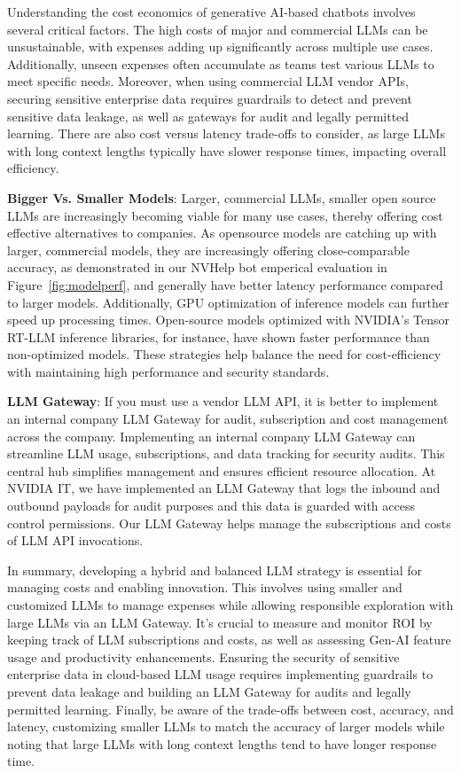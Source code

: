 \documentclass[sigconf]{acmart}
\begin{document}
Understanding the cost economics of generative AI-based chatbots involves several critical factors. The high costs of major and commercial LLMs can be unsustainable, with expenses adding up significantly across multiple use cases. Additionally, unseen expenses often accumulate as teams test various LLMs to meet specific needs. Moreover, when using commercial LLM vendor APIs, securing sensitive enterprise data requires guardrails to detect and prevent sensitive data leakage, as well as gateways for audit and legally permitted learning. There are also cost versus latency trade-offs to consider, as large LLMs with long context lengths typically have slower response times, impacting overall efficiency.

\textbf{Bigger Vs. Smaller Models}: Larger, commercial LLMs, smaller open source LLMs are increasingly becoming viable for many use cases, thereby offering cost effective alternatives to companies. As opensource models are catching up with larger, commercial models, they are increasingly offering close-comparable accuracy, as demonstrated in our NVHelp bot emperical evaluation in Figure~\ref{fig:modelperf}, and generally have better latency performance compared to larger models. Additionally, GPU optimization of inference models can further speed up processing times. Open-source models optimized with NVIDIA’s Tensor RT-LLM inference libraries, for instance, have shown faster performance than non-optimized models. These strategies help balance the need for cost-efficiency with maintaining high performance and security standards.

\textbf{LLM Gateway}: If you must use a vendor LLM API, it is better to implement an internal company LLM Gateway for audit, subscription and cost management across the company. Implementing an internal company LLM Gateway can streamline LLM usage, subscriptions, and data tracking for security audits. This central hub simplifies management and ensures efficient resource allocation. At NVIDIA IT, we have implemented an LLM Gateway that logs the inbound and outbound payloads for audit purposes and this data is guarded with access control permissions. Our LLM Gateway helps manage the subscriptions and costs of LLM API invocations. 

In summary, developing a hybrid and balanced LLM strategy is essential for managing costs and enabling innovation. This involves using smaller and customized LLMs to manage expenses while allowing responsible exploration with large LLMs via an LLM Gateway. It's crucial to measure and monitor ROI by keeping track of LLM subscriptions and costs, as well as assessing Gen-AI feature usage and productivity enhancements. Ensuring the security of sensitive enterprise data in cloud-based LLM usage requires implementing guardrails to prevent data leakage and building an LLM Gateway for audits and legally permitted learning. Finally, be aware of the trade-offs between cost, accuracy, and latency, customizing smaller LLMs to match the accuracy of larger models while noting that large LLMs with long context lengths tend to have longer response time.
\end{document}
